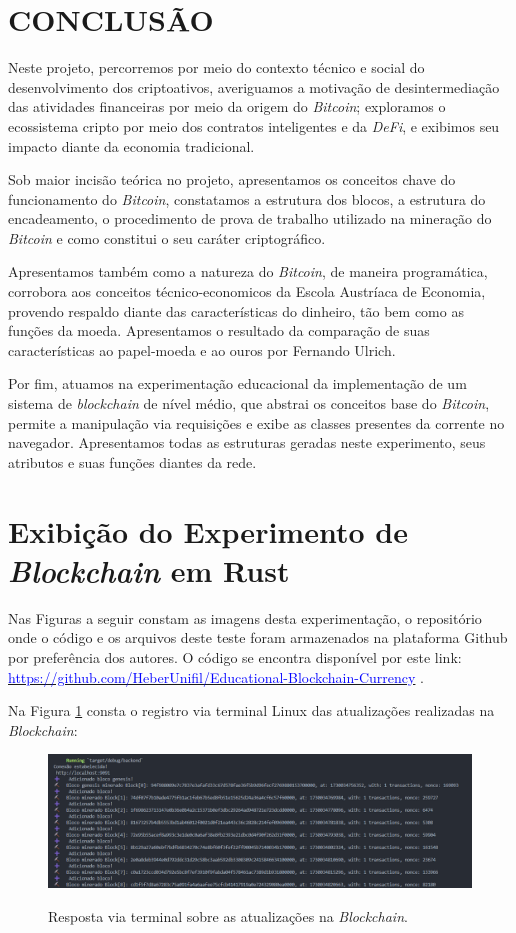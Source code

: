 \section*{CONCLUSÃO}
Neste projeto, percorremos por meio do contexto técnico e social do desenvolvimento dos criptoativos, averiguamos a motivação de desintermediação das atividades financeiras por meio da origem do \textit{Bitcoin}; exploramos o ecossistema cripto por meio dos contratos inteligentes e da \textit{DeFi}, e exibimos seu impacto diante da economia tradicional.

Sob maior incisão teórica no projeto, apresentamos os conceitos chave do funcionamento do \textit{Bitcoin}, constatamos a estrutura dos blocos, a estrutura do encadeamento, o procedimento de prova de trabalho utilizado na mineração do \textit{Bitcoin} e como constitui o seu caráter criptográfico.

Apresentamos também como a natureza do \textit{Bitcoin}, de maneira programática, corrobora aos conceitos técnico-economicos da Escola Austríaca de Economia, provendo respaldo diante das características do dinheiro, tão bem como as funções da moeda. Apresentamos o resultado da comparação de suas características ao papel-moeda e ao ouros por Fernando Ulrich.

Por fim, atuamos na experimentação educacional da implementação de um sistema de \textit{blockchain} de nível médio, que abstrai os conceitos base do \textit{Bitcoin}, permite a manipulação via requisições e exibe as classes presentes da corrente no navegador. Apresentamos todas as estruturas geradas neste experimento, seus atributos e suas funções diantes da rede.

\section*{Exibição do Experimento de \textit{Blockchain} em Rust}
Nas Figuras a seguir constam as imagens desta experimentação, o repositório onde o código e os arquivos deste teste foram armazenados na plataforma Github por preferência dos autores. O código se encontra disponível por este link:
\href{https://github.com/HeberUnifil/Educational-Blockchain-Currency}{\textcolor{blue}{https://github.com/HeberUnifil/Educational-Blockchain-Currency}} .

Na Figura \ref*{fig:terminal} consta o registro via terminal Linux das atualizações realizadas na \textit{Blockchain}:

\begin{figure} [h]
	\centering
	\caption{Resposta via terminal sobre as atualizações na \textit{Blockchain}.}
	\includegraphics[width=.8\linewidth]{../images/terminal-blockchain.png}
	\label{fig:terminal}

\end{figure}

